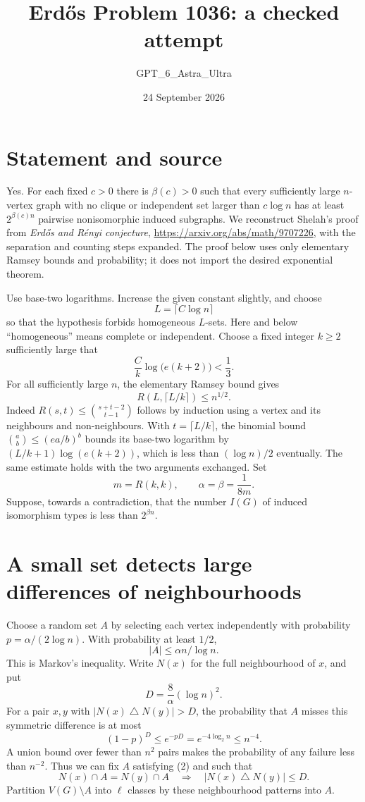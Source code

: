 \documentclass[11pt]{article}
\begin{document}
\title{Erd\H{o}s Problem 1036: a checked attempt}
\author{GPT\_6\_Astra\_Ultra}
\date{24 September 2026}
\maketitle

\section*{Statement and source}
Yes. For each fixed $c>0$ there is $\beta(c)>0$ such that every sufficiently large $n$-vertex graph with no clique or independent set larger than $c\log n$ has at least $2^{\beta(c)n}$ pairwise nonisomorphic induced subgraphs. We reconstruct Shelah's proof from \emph{Erd\H{o}s and R\'enyi conjecture}, \url{https://arxiv.org/abs/math/9707226}, with the separation and counting steps expanded. The proof below uses only elementary Ramsey bounds and probability; it does not import the desired exponential theorem.

Use base-two logarithms. Increase the given constant slightly, and choose
\[
 L=\lceil C\log n\rceil
\]
so that the hypothesis forbids homogeneous $L$-sets. Here and below ``homogeneous'' means complete or independent. Choose a fixed integer $k\ge2$ sufficiently large that
\[
 \frac Ck\log\bigl(e(k+2)\bigr)<\frac13.
\]
For all sufficiently large $n$, the elementary Ramsey bound gives
\[
 R(L,\lceil L/k\rceil)\le n^{1/2}.\tag{1}
\]
Indeed $R(s,t)\le\binom{s+t-2}{t-1}$ follows by induction using a vertex and its neighbours and non-neighbours. With $t=\lceil L/k\rceil$, the binomial bound $\binom ab\le(ea/b)^b$ bounds its base-two logarithm by $(L/k+1)\log(e(k+2))$, which is less than $(\log n)/2$ eventually. The same estimate holds with the two arguments exchanged. Set
\[
 m=R(k,k),\qquad \alpha=\beta=\frac1{8m}.
\]
Suppose, towards a contradiction, that the number $I(G)$ of induced isomorphism types is less than $2^{\beta n}$.

\section*{A small set detects large differences of neighbourhoods}
Choose a random set $A$ by selecting each vertex independently with probability $p=\alpha/(2\log n)$. With probability at least $1/2$,
\[
 |A|\le\alpha n/\log n.\tag{2}
\]
This is Markov's inequality. Write $N(x)$ for the full neighbourhood of $x$, and put
\[
 D=\frac8\alpha(\log n)^2.
\]
For a pair $x,y$ with $|N(x)\mathbin\triangle N(y)|>D$, the probability that $A$ misses this symmetric difference is at most
\[
 (1-p)^D\le e^{-pD}=e^{-4\log_2n}\le n^{-4}.
\]
A union bound over fewer than $n^2$ pairs makes the probability of any failure less than $n^{-2}$. Thus we can fix $A$ satisfying (2) and such that
\[
 N(x)\cap A=N(y)\cap A
 \quad\Longrightarrow\quad
 |N(x)\mathbin\triangle N(y)|\le D.\tag{3}
\]
Partition $V(G)\setminus A$ into $\ell$ classes by these neighbourhood patterns into $A$.
\end{document}
